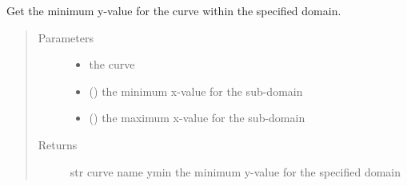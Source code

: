 \documentclass[letterpaper,10pt,english]{sphinxmanual}
\begin{document}
\begin{fulllineitems}
\label{\detokenize{pydv:pydvpy.getymin}}
Get the minimum y-value for the curve within the specified domain.
\begin{quote}\begin{description}
\item[{Parameters}] \leavevmode\begin{itemize}
\item {} 
 \textendash{} the curve

\item {} 
 (\sphinxstyleliteralemphasis{\sphinxupquote{, }}) \textendash{} the minimum x-value for the sub-domain

\item {} 
 (\sphinxstyleliteralemphasis{\sphinxupquote{, }}) \textendash{} the maximum x-value for the sub-domain

\end{itemize}

\item[{Returns}] \leavevmode
str \textendash{} curve name
ymin \textendash{} the minimum y-value for the specified domain

\end{description}\end{quote}

\end{fulllineitems}

\end{document}
